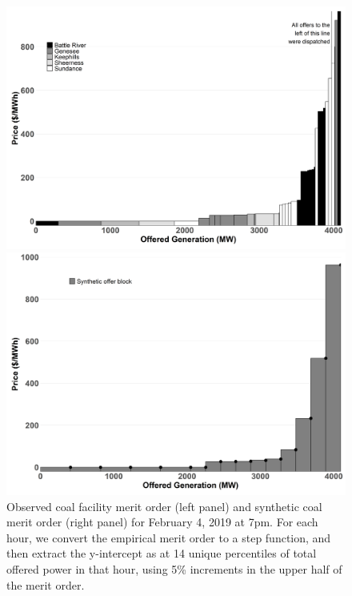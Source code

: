 \documentclass[12pt]{article}
\begin{document}
\begin{figure}[tb]
    \centering
    \begin{minipage}{.5\textwidth}
        \centering
        \includegraphics[width=.9\textwidth]{../images/coal_merit.png}
    \end{minipage}%
    \begin{minipage}{0.5\textwidth}
        \centering
        \includegraphics[width=.9\textwidth]{../images/coal_synth_merit}
    \end{minipage}
    \caption{Observed coal facility merit order (left panel) and synthetic coal merit order (right panel) for February 4, 2019 at 7pm. For each hour, we convert the empirical merit order to a step function, and then extract the y-intercept as at 14 unique percentiles of total offered power in that hour, using 5\% increments in the upper half of the merit order.}
    \label{fig:synth_merit}
\end{figure}
\end{document}
